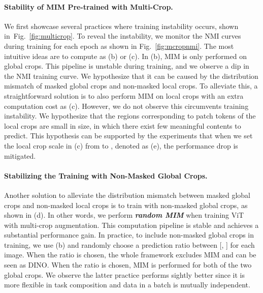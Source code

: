 \documentclass{article} \usepackage{iclr2022_conference,times}
\begin{document}
\paragraph{Stability of MIM Pre-trained with Multi-Crop.} 
We first showcase several practices where training instability occurs, shown in~Fig.~\ref{fig:multicrop}.
To reveal the instability, we monitor the NMI curves during training for each epoch as shown in Fig.~\ref{fig:mcropnmi}. 
The most intuitive ideas are to compute as (b) or (c). 
In (b), MIM is only performed on global crops. This pipeline is unstable during training, and we observe a dip in the NMI training curve. We hypothesize that it can be caused by the distribution mismatch of masked global crops and non-masked local crops. 
To alleviate this, a straightforward solution is to also perform MIM on local crops with an extra computation cost as (c). However, we do not observe this circumvents training instability. We hypothesize that the regions corresponding to patch tokens of the local crops are small in size, in which there exist few meaningful contents to predict. This hypothesis can be supported by the experiments that when we set the local crop scale in (c) from  to , denoted as (e), the performance drop is mitigated.

\paragraph{Stabilizing the Training with Non-Masked Global Crops.} 
Another solution to alleviate the distribution mismatch between masked global crops and non-masked local crops is to train with non-masked global crops, as shown in (d). 
In other words, we perform \textbf{\textit{random MIM}} when training ViT with multi-crop augmentation.
This computation pipeline is stable and achieves a substantial performance gain. In practice, to include non-masked global crops in training, we use (b) and randomly choose a prediction ratio between [, ] for each image. When the ratio  is chosen, the whole framework excludes MIM and can be seen as DINO. When the ratio  is chosen, MIM is performed for both of the two global crops. We observe the latter practice performs sightly better since it is more flexible in task composition and data in a batch is mutually independent.
\end{document}
